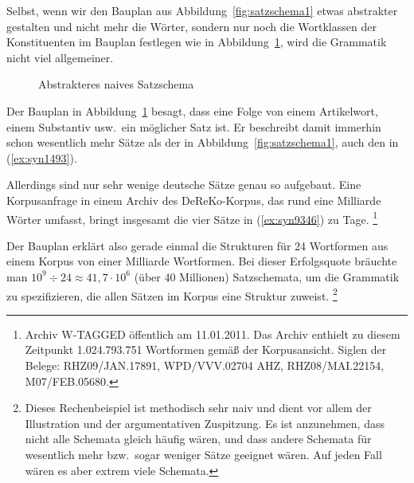 Selbst, wenn wir den Bauplan aus Abbildung~\ref{fig:satzschema1} etwas abstrakter gestalten und nicht mehr die Wörter, sondern nur noch die Wortklassen der Konstituenten im Bauplan festlegen wie in Abbildung~\ref{fig:satzschema2}, wird die Grammatik nicht viel allgemeiner.

\begin{figure}[!htbp]
  \centering
  \caption{Abstrakteres naives Satzschema}
  \label{fig:satzschema2}
\end{figure}

Der Bauplan in Abbildung~\ref{fig:satzschema2} besagt, dass eine Folge von einem Artikelwort, einem Substantiv usw.\ ein möglicher Satz ist.
Er beschreibt damit immerhin schon wesentlich mehr Sätze als der in Abbildung~\ref{fig:satzschema1}, \zB auch den in (\ref{ex:syn1493}).

\begin{exe}
\end{exe}

Allerdings sind nur sehr wenige deutsche Sätze genau so aufgebaut.
Eine Korpusanfrage in einem Archiv des DeReKo-Korpus, das rund eine Milliarde Wörter umfasst, bringt insgesamt die vier Sätze in (\ref{ex:syn9346}) zu Tage.%
\footnote{Archiv W-TAGGED öffentlich am 11.01.2011.
Das Archiv enthielt zu diesem Zeitpunkt 1.024.793.751 Wortformen gemäß der Korpusansicht.
Siglen der Belege: RHZ09/JAN.17891, WPD/VVV.02704 AHZ, RHZ08/MAI.22154, M07/FEB.05680.}

\begin{exe}
  \ex \label{ex:syn9346}
  \begin{xlist}
  \end{xlist}
\end{exe}

Der Bauplan erklärt also gerade einmal die Strukturen für 24 Wortformen aus einem Korpus von einer Milliarde Wortformen.
Bei dieser Erfolgsquote bräuchte man $10^9\div24\approx41,7\cdot10^6$ (über 40 Millionen) Satzschemata, um die Grammatik zu spezifizieren, die allen Sätzen im Korpus eine Struktur zuweist.%
\footnote{Dieses Rechenbeispiel ist methodisch sehr naiv und dient vor allem der Illustration und der argumentativen Zuspitzung.
Es ist \zB anzunehmen, dass nicht alle Schemata gleich häufig wären, und dass andere Schemata für wesentlich mehr bzw.\ sogar weniger Sätze geeignet wären.
Auf jeden Fall wären es aber extrem viele Schemata.}


